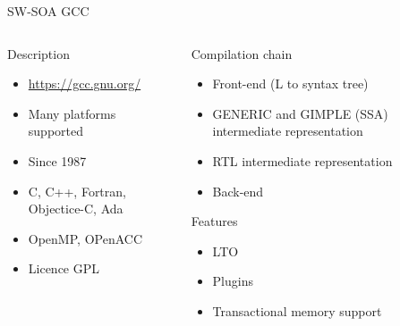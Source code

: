 %
\begin{Frame}{SW-SOA GCC}
  \begin{columns}[t]
    \begin{column}{\BW} %
      \begin{block}{Description}
        \begin{itemize}
        \item \href{https://gcc.gnu.org/}{https://gcc.gnu.org/}
        \item Many platforms supported 
        \item Since 1987
        \item C, C++, Fortran, Objectice-C, Ada
        \item OpenMP, OPenACC
        \item Licence GPL
        \end{itemize}
      \end{block} 
    \end{column}
    
    \begin{column}{6cm} %
      \begin{block}{Compilation chain}
        \begin{itemize}
        \item Front-end (L to syntax tree)
        \item GENERIC and GIMPLE (SSA) intermediate representation
        \item RTL intermediate representation
        \item Back-end
        \end{itemize}
      \end{block}   
        \begin{block}{Features}
          \begin{itemize}
          \item LTO
          \item Plugins
          \item Transactional memory support
          \end{itemize}
        \end{block}
    \end{column}
  \end{columns}  
\end{Frame}


